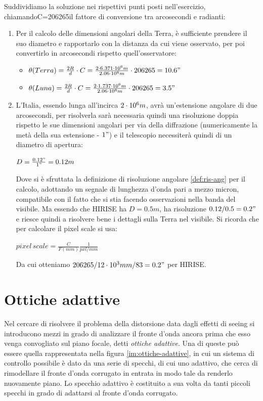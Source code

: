 \begin{sol}
	Suddividiamo la soluzione nei rispettivi punti posti nell’esercizio, chiamandoC=206265il fattore di conversione tra arcosecondi e radianti:
	\begin{enumerate}
		\item Per il calcolo delle dimensioni angolari della Terra, è sufficiente prendere il suo diametro e rapportarlo con la distanza da cui viene osservato, per poi convertirlo in arcosecondi rispetto quell'osservatore:
		\begin{itemize}
			\item $\theta(Terra)=\frac{2R}{d}\cdot C=\frac{2\cdot 6.371\cdot 10^{6}m}{2.06\cdot 10^{8}m}\cdot 206265=10.6"$
			\item  $\theta(Luna)=\frac{2R}{d}\cdot C=\frac{2\cdot 1.737\cdot 10^{6}m}{2.06\cdot 10^{8}m}\cdot 206265=3.5"$
		\end{itemize}
		\item L'Italia, essendo lunga all'incirca $2\cdot 10^{6}m$, avrà un'estensione angolare di due arcosecondi, per risolverla sarà necessaria quindi una risoluzione doppia rispetto le sue dimensioni angolari per via della diffrazione (numericamente la metà della sua estensione - $1"$) e il telescopio necessiterà quindi di un diametro di apertura:
		
		$D=\frac{0.12"}{1"}=0.12m$
		
		Dove si è sfruttata la definizione di risoluzione angolare \ref{def:ris-ang} per il calcolo, adottando un segnale di lunghezza d'onda pari a mezzo micron, compatibile con il fatto che si stia facendo osservazioni nella banda del visibile. Ma essendo che HIRISE ha $D=0.5m$, ha risoluzione $0.12/0.5=0.2"$ e riesce quindi a risolvere bene i dettagli sulla Terra nel visibile. Si ricorda che per calcolare il pixel scale si usa:

		$pixel \, scale = \frac{C}{F(mm)}\frac{1}{pxl/mm}$

		Da cui otteniamo $206265/12\cdot 10^{3}mm/83=0.2"$ per HIRISE.
	\end{enumerate}
\end{sol}

\section{Ottiche adattive}

Nel cercare di risolvere il problema della distorsione data dagli effetti di seeing si introducono mezzi in grado di analizzare il fronte d'onda ancora prima che esso venga convogliato sul piano focale, detti \textit{ottiche adattive}. Una di queste può essere quella rappresentata nella figura \ref{im:ottiche-adattive}, in cui un sistema di controllo possibile è dato da una serie di specchi, di cui uno adattivo, che cerca di rimodellare il fronte d'onda corrugato in entrata in modo tale da renderlo nuovamente piano. Lo specchio adattivo è costituito a sua volta da tanti piccoli specchi in grado di adattarsi al fronte d'onda corrugato.

